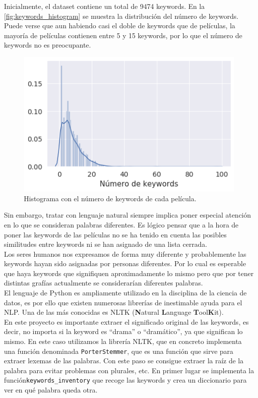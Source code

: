 Inicialmente, el dataset contiene un total de 9474 keywords. En la \autoref{fig:keywords_histogram} se muestra la distribución del número de keywords. Puede verse que aun habiendo casi el doble de keywords que de películas, la mayoría de películas contienen entre 5 y 15 keywords, por lo que el número de keywords no es preocupante.
\begin{figure}[H]
    \centering
    \captionsetup{width=10cm}
    \includegraphics[width=12cm]{contenido/imagenes/keyword_histogram.png}
    \caption{Histograma con el número de keywords de cada película.}
    \label{fig:keywords_histogram}
\end{figure}

Sin embargo, tratar con lenguaje natural siempre implica poner especial atención en lo que se consideran palabras diferentes. Es lógico pensar que a la hora de poner las keywords de las películas no se ha tenido en cuenta las posibles similitudes entre keywords ni se han asignado de una lista cerrada.\\

Los seres humanos nos expresamos de forma muy diferente y probablemente las keywords hayan sido asignadas por personas diferentes. Por lo cual es esperable que haya keywords que signifiquen aproximadamente lo mismo pero que por tener distintas grafías actualmente se considerarían diferentes palabras.\\

El lenguaje de Python es ampliamente utilizado en la disciplina de la ciencia de datos, es por ello que existen numerosas librerías de inestimable ayuda para el NLP. Una de las más conocidas es NLTK \cite{NLTK} (\textbf{N}atural \textbf{L}anguage \textbf{T}ool\textbf{K}it).\\

En este proyecto es importante extraer el significado original de las keywords, es decir, no importa si la keyword es ``drama'' o ``dramático'', ya que significan lo mismo. En este caso utilizamos la librería NLTK, que en concreto implementa una función denominada \texttt{PorterStemmer}\cite{porter}, que es una función que sirve para extraer lexemas de las palabras. Con este paso se consigue extraer la raíz de la palabra para evitar problemas con plurales, etc. En primer lugar se implementa la función\texttt{keywords\_inventory} que recoge las keywords y crea un diccionario para ver en qué palabra queda otra.

